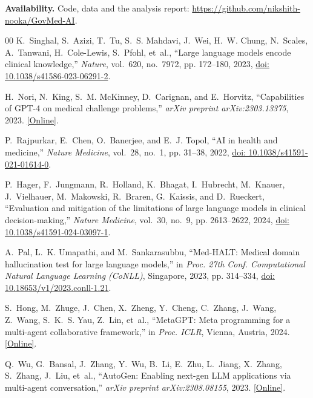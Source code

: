 \documentclass[conference]{IEEEtran}
\begin{document}
\textbf{Availability.} Code, data and the analysis report: \url{https://github.com/nikshith-nooka/GovMed-AI}.

\begin{thebibliography}{00}
\fontsize{7.0pt}{8.0pt}\selectfont
\setlength{\itemsep}{0pt}
\setlength{\parsep}{0pt}
K.~Singhal, S.~Azizi, T.~Tu, S.~S. Mahdavi, J.~Wei, H.~W. Chung, N.~Scales, A.~Tanwani, H.~Cole-Lewis, S.~Pfohl, et~al., ``Large language models encode clinical knowledge,'' \emph{Nature}, vol.~620, no.~7972, pp. 172--180, 2023, \href{https://doi.org/10.1038/s41586-023-06291-2}{doi: 10.1038/s41586-023-06291-2}.

H.~Nori, N.~King, S.~M. McKinney, D.~Carignan, and E.~Horvitz, ``Capabilities of GPT-4 on medical challenge problems,'' \emph{arXiv preprint arXiv:2303.13375}, 2023. \href{https://arxiv.org/abs/2303.13375}{[Online]}.

P.~Rajpurkar, E.~Chen, O.~Banerjee, and E.~J. Topol, ``AI in health and medicine,'' \emph{Nature Medicine}, vol.~28, no.~1, pp. 31--38, 2022, \href{https://doi.org/10.1038/s41591-021-01614-0}{doi: 10.1038/s41591-021-01614-0}.

P.~Hager, F.~Jungmann, R.~Holland, K.~Bhagat, I.~Hubrecht, M.~Knauer, J.~Vielhauer, M.~Makowski, R.~Braren, G.~Kaissis, and D.~Rueckert, ``Evaluation and mitigation of the limitations of large language models in clinical decision-making,'' \emph{Nature Medicine}, vol.~30, no.~9, pp. 2613--2622, 2024, \href{https://doi.org/10.1038/s41591-024-03097-1}{doi: 10.1038/s41591-024-03097-1}.

A.~Pal, L.~K. Umapathi, and M.~Sankarasubbu, ``Med-HALT: Medical domain hallucination test for large language models,'' in \emph{Proc. 27th Conf. Computational Natural Language Learning (CoNLL)}, Singapore, 2023, pp. 314--334, \href{https://doi.org/10.18653/v1/2023.conll-1.21}{doi: 10.18653/v1/2023.conll-1.21}.

S.~Hong, M.~Zhuge, J.~Chen, X.~Zheng, Y.~Cheng, C.~Zhang, J.~Wang, Z.~Wang, S.~K.~S. Yau, Z.~Lin, et~al., ``MetaGPT: Meta programming for a multi-agent collaborative framework,'' in \emph{Proc. ICLR}, Vienna, Austria, 2024. \href{https://arxiv.org/abs/2308.00352}{[Online]}.

Q.~Wu, G.~Bansal, J.~Zhang, Y.~Wu, B.~Li, E.~Zhu, L.~Jiang, X.~Zhang, S.~Zhang, J.~Liu, et~al., ``AutoGen: Enabling next-gen LLM applications via multi-agent conversation,'' \emph{arXiv preprint arXiv:2308.08155}, 2023. \href{https://arxiv.org/abs/2308.08155}{[Online]}.


\end{thebibliography}
\end{document}

